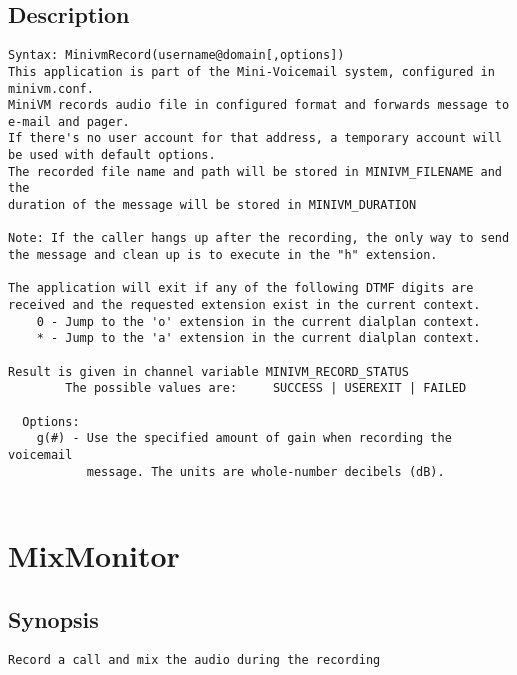 \subsection{Description}
\begin{verbatim}
Syntax: MinivmRecord(username@domain[,options])
This application is part of the Mini-Voicemail system, configured in minivm.conf.
MiniVM records audio file in configured format and forwards message to e-mail and pager.
If there's no user account for that address, a temporary account will
be used with default options.
The recorded file name and path will be stored in MINIVM_FILENAME and the 
duration of the message will be stored in MINIVM_DURATION

Note: If the caller hangs up after the recording, the only way to send
the message and clean up is to execute in the "h" extension.

The application will exit if any of the following DTMF digits are 
received and the requested extension exist in the current context.
    0 - Jump to the 'o' extension in the current dialplan context.
    * - Jump to the 'a' extension in the current dialplan context.

Result is given in channel variable MINIVM_RECORD_STATUS
        The possible values are:     SUCCESS | USEREXIT | FAILED

  Options:
    g(#) - Use the specified amount of gain when recording the voicemail
           message. The units are whole-number decibels (dB).


\end{verbatim}


\section{MixMonitor}
\subsection{Synopsis}
\begin{verbatim}
Record a call and mix the audio during the recording
\end{verbatim}
